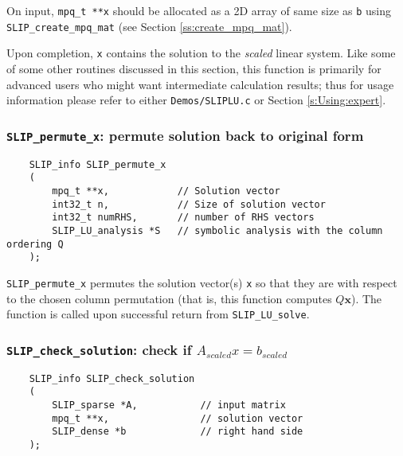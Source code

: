 \documentclass[12pt]{article}
\theoremstyle{definition}
\begin{document}
On input, \verb|mpq_t **x| should be allocated as a 2D array of same size as
\verb|b| using \verb|SLIP_create_mpq_mat| (see Section
\ref{ss:create_mpq_mat}).

Upon completion, \verb|x| contains the solution to the \textit{scaled} linear
system. Like some of some other routines discussed in this section, this
function is primarily for advanced users who might want intermediate
calculation results; thus for usage information please refer to either
\verb|Demos/SLIPLU.c| or Section \ref{s:Using:expert}.

\cprotect\subsubsection{\verb|SLIP_permute_x|: permute solution back to original form}
\label{ss:SLIP_permute_x}

\begin{mdframed}[userdefinedwidth=6in]
{\footnotesize
\begin{verbatim}
    SLIP_info SLIP_permute_x
    (
        mpq_t **x,            // Solution vector
        int32_t n,            // Size of solution vector
        int32_t numRHS,       // number of RHS vectors
        SLIP_LU_analysis *S   // symbolic analysis with the column ordering Q
    );
\end{verbatim}
} \end{mdframed}


\verb|SLIP_permute_x| permutes the solution vector(s) \verb|x| so that they are
with respect to the chosen column permutation (that is, this function computes
$Q \mathbf{x}$). The function is called upon successful return from
\verb|SLIP_LU_solve|.

\cprotect\subsubsection{\verb|SLIP_check_solution|: check if $A_{scaled}x=b_{scaled}$}

\begin{mdframed}[userdefinedwidth=6in]
{\footnotesize
\begin{verbatim}
    SLIP_info SLIP_check_solution
    (
        SLIP_sparse *A,           // input matrix
        mpq_t **x,                // solution vector
        SLIP_dense *b             // right hand side
    );
\end{verbatim}
} \end{mdframed}
\end{document}
